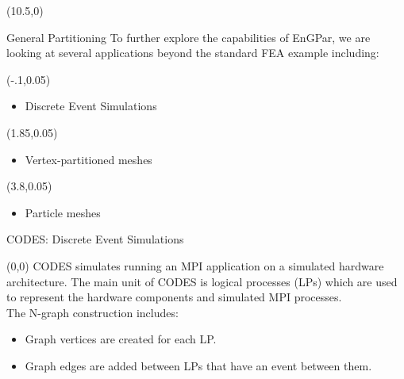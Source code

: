 \documentclass{beamer}
\begin{document}
\begin{textblock}{15.6}
  \begin{textblock}{5.2}(10.5,0)
    \begin{block}{\centering General Partitioning}
      To further explore the capabilities of EnGPar, we are looking at several applications beyond the standard FEA example including:
      \begin{textblock}{2.5}(-.1,0.05)
        \begin{itemize}
        \item Discrete Event Simulations
        \end{itemize}
      \end{textblock}
      \begin{textblock}{2.5}(1.85,0.05)
        \begin{itemize}
        \item Vertex-partitioned meshes
        \end{itemize}
      \end{textblock}
      \begin{textblock}{2.5}(3.8,0.05)
        \begin{itemize}
        \item Particle meshes
        \end{itemize}
      \end{textblock}
      \vspace{1.6cm}
    \end{block}
    \begin{block}{\centering CODES: Discrete Event Simulations}
      \begin{textblock}{3.3}(0,0)
      CODES simulates running an MPI application on a simulated
      hardware architecture. The main unit of CODES is logical processes (LPs) which are used
      to represent the hardware components and simulated MPI processes. \\[.2cm]
      The N-graph construction includes:
      \begin{itemize}
      \item Graph vertices are created for each LP.
      \item Graph edges are added between LPs that have an event between them.
      \end{itemize}


\end{textblock}
\end{block}
\end{textblock}
\end{textblock}
\end{document}
